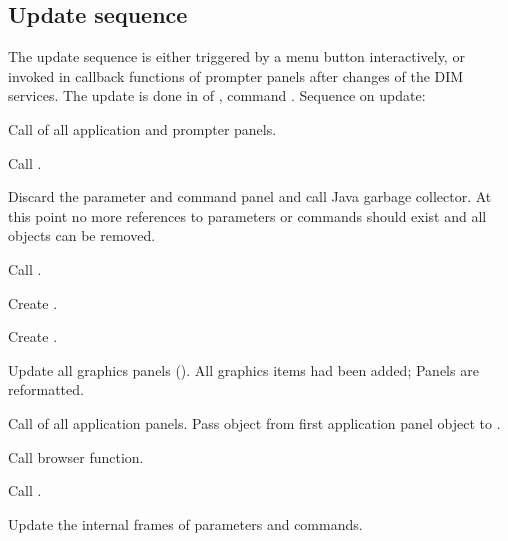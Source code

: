 \subsection{Update sequence}
The update sequence is either triggered by a menu button interactively, or invoked
in callback functions of prompter panels
after changes of the DIM services.
The update is done in  of , command .
Sequence on update:
\bnum
\item Call  of all application and prompter panels.
\item Call .
\item Discard the parameter and command panel and call Java garbage collector.
At this point no more references to parameters or commands should exist and
all objects can be removed.
\item Call .
\item Create .
\item Create .
\item Update all graphics panels (). All graphics items had been added;
Panels are reformatted.
\item Call  of all application panels. Pass
 object from first application panel object to .
\item Call browser  function. 
\item Call .
\item Update the internal frames of parameters and commands.
\enum 

